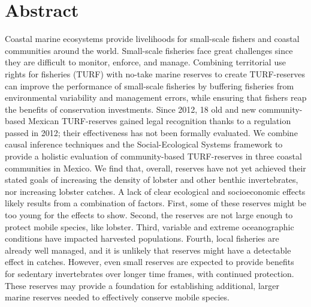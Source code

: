 \documentclass[10pt,letterpaper]{article}
\begin{document}
\section*{Abstract}
Coastal marine ecosystems provide livelihoods for small-scale fishers and coastal communities around the world. Small-scale fisheries face great challenges since they are difficult to monitor, enforce, and manage. Combining territorial use rights for fisheries (TURF) with no-take marine reserves to create TURF-reserves can improve the performance of small-scale fisheries by buffering fisheries from environmental variability and management errors, while ensuring that fishers reap the benefits of conservation investments. Since 2012, 18 old and new community-based Mexican TURF-reserves gained legal recognition thanks to a regulation passed in 2012; their effectiveness has not been formally evaluated. We combine causal inference techniques and the Social-Ecological Systems framework to provide a holistic evaluation of community-based TURF-reserves in three coastal communities in Mexico. We find that, overall, reserves have not yet achieved their stated goals of increasing the density of lobster and other benthic invertebrates, nor increasing lobster catches. A lack of clear ecological and socioeconomic effects likely results from a combination of factors. First, some of these reserves might be too young for the effects to show. Second, the reserves are not large enough to protect mobile species, like lobster. Third, variable and extreme oceanographic conditions have impacted harvested populations. Fourth, local fisheries are already well managed, and it is unlikely that reserves might have a detectable effect in catches. However, even small reserves are expected to provide benefits for sedentary invertebrates over longer time frames, with continued protection. These reserves may provide a foundation for establishing additional, larger marine reserves needed to effectively conserve mobile species.

\end{document}
